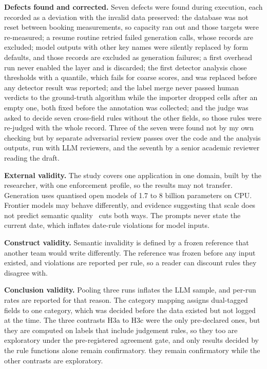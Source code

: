 \documentclass[conference]{IEEEtran}
\begin{document}
\textbf{Defects found and corrected.} Seven defects were found during execution, each recorded as a
deviation with the invalid data preserved: the database was not reset between booking measurements, so
capacity ran out and those targets were re-measured; a resume routine retried failed generation calls,
whose records are excluded; model outputs with other key names were silently replaced by form defaults,
and those records are excluded as generation failures; a first overhead run never enabled the layer and
is discarded; the first detector analysis chose thresholds with a quantile, which fails for coarse
scores, and was replaced before any detector result was reported; and the label merge never passed
human verdicts to the ground-truth algorithm while the importer dropped cells after an empty one, both
fixed before the annotation was collected; and the judge was asked to decide seven cross-field rules
without the other fields, so those rules were re-judged with the whole record. Three of the seven were
found not by my own checking but by separate adversarial review passes over the code and the analysis
outputs, run with LLM reviewers, and the seventh by a senior academic reviewer reading the draft.

\textbf{External validity.} The study covers one application in one domain, built by the researcher,
with one enforcement profile, so the results may not transfer. Generation uses quantised open models of
1.7 to 8 billion parameters on CPU. Frontier models may behave differently, and evidence suggesting that scale
does not predict semantic quality~\cite{singh2026sob,wrenn2026enterprise} cuts both ways. The prompts
never state the current date, which inflates date-rule violations for model inputs.

\textbf{Construct validity.} Semantic invalidity is defined by a frozen reference that another team
would write differently. The reference was frozen before any input existed, and violations are reported
per rule, so a reader can discount rules they disagree with.

\textbf{Conclusion validity.} Pooling three runs inflates the LLM sample, and per-run rates are
reported for that reason. The category mapping assigns dual-tagged fields to one category, which was
decided before the data existed but not logged at the time. The three contrasts H3a to H3c were the
only pre-declared ones, but they are computed on labels that include judgement rules,
so\ifjudgeweak{} they too are exploratory under the pre-registered agreement gate, and only results
decided by the rule functions alone remain confirmatory.\else{} they remain confirmatory while the
other contrasts are exploratory.\fi
\end{document}
